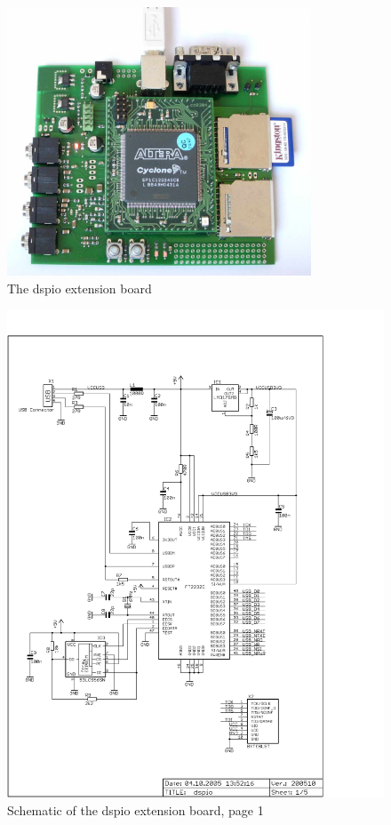 \begin{figure}[h]
    \centering
    \includegraphics[height=80mm]{appendix/dspio}
    \caption{The dspio extension board}
\end{figure}
\begin{figure}
    \centering
    \includegraphics[scale=0.68]{appendix/dspio_p1}
    \caption{Schematic of the dspio extension board, page 1}
\end{figure}
